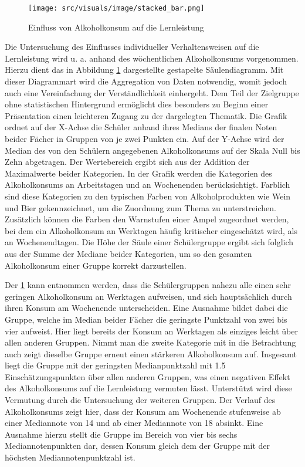 \clearpage
\begin{figure}[htb]
    \centering
    \texttt{[image: src/visuals/image/stacked\_bar.png]}
    \caption{Einfluss von Alkoholkonsum auf die Lernleistung}
    \label{fig:stacked_bar}
\end{figure}

Die Untersuchung des Einflusses individueller Verhaltensweisen auf die Lernleistung wird u. a. anhand des wöchentlichen Alkoholkonsums vorgenommen.
Hierzu dient das in Abbildung \ref{fig:stacked_bar} dargestellte gestapelte Säulendiagramm.
Mit dieser Diagrammart wird die Aggregation von Daten notwendig, womit jedoch auch eine Vereinfachung der Verständlichkeit einhergeht.
Dem Teil der Zielgruppe ohne statistischen Hintergrund ermöglicht dies besonders zu Beginn einer Präsentation einen leichteren Zugang zu der dargelegten Thematik.
Die Grafik ordnet auf der X-Achse die Schüler anhand ihres Medians der finalen Noten beider Fächer in Gruppen von je zwei Punkten ein.
Auf der Y-Achse wird der Median des von den Schülern angegebenen Alkoholkonsums auf der Skala Null bis Zehn abgetragen.
Der Wertebereich ergibt sich aus der Addition der Maximalwerte beider Kategorien.
In der Grafik werden die Kategorien des Alkoholkonsums an Arbeitstagen und an Wochenenden berücksichtigt.
Farblich sind diese Kategorien zu den typischen Farben von Alkoholprodukten wie Wein und Bier gekennzeichnet, um die Zuordnung zum Thema zu unterstreichen.
Zusätzlich können die Farben den Warnstufen einer Ampel zugeordnet werden, bei dem ein Alkoholkonsum an Werktagen häufig kritischer eingeschätzt wird, als an Wochenendtagen.
Die Höhe der Säule einer Schülergruppe ergibt sich folglich aus der Summe der Mediane beider Kategorien, um so den gesamten Alkoholkonsum einer Gruppe korrekt darzustellen.

Der \ref*{fig:stacked_bar} kann entnommen werden, dass die Schülergruppen nahezu alle einen sehr geringen Alkoholkonsum an Werktagen aufweisen, und sich hauptsächlich durch ihren Konsum am Wochenende unterscheiden.
Eine Ausnahme bildet dabei die Gruppe, welche im Median beider Fächer die geringste Punktzahl von zwei bis vier aufweist. 
Hier liegt bereits der Konsum an Werktagen als einziges leicht über allen anderen Gruppen.
Nimmt man die zweite Kategorie mit in die Betrachtung auch zeigt dieselbe Gruppe erneut einen stärkeren Alkoholkonsum auf.
Insgesamt liegt die Gruppe mit der geringsten Medianpunktzahl mit 1.5 Einschätzungspunkten über allen anderen Gruppen, was einen negativen Effekt des Alkoholkonsums auf die Lernleistung vermuten lässt.
Unterstützt wird diese Vermutung durch die Untersuchung der weiteren Gruppen. 
Der Verlauf des Alkoholkonsums zeigt hier, dass der Konsum am Wochenende stufenweise ab einer Mediannote von 14 und ab einer Mediannote von 18 absinkt. 
Eine Ausnahme hierzu stellt die Gruppe im Bereich von vier bis sechs Mediannotenpunkten dar, dessen Konsum gleich dem der Gruppe mit der höchsten Mediannotenpunktzahl ist.

